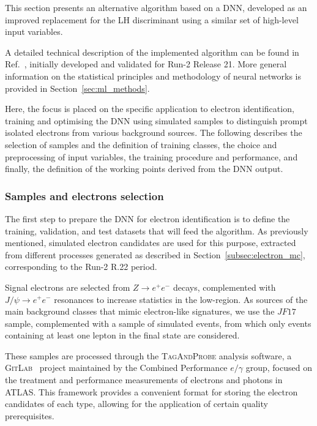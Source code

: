 This section presents an alternative algorithm based on a DNN, developed as an improved replacement for the LH discriminant using a similar set of high-level input variables.

A detailed technical description of the implemented algorithm can be found in Ref.~\cite{dnn_paper}, initially developed and validated for Run-2 Release 21. More general information on the statistical principles and methodology of neural networks is provided in Section~\ref{sec:ml_methods}.

Here, the focus is placed on the specific application to electron identification, training and optimising the DNN using simulated samples to distinguish prompt isolated electrons from various background sources. The following describes the selection of samples and the definition of training classes, the choice and preprocessing of input variables, the training procedure and performance, and finally, the definition of the working points derived from the DNN output.

\subsubsection{Samples and electrons selection}
The first step to prepare the DNN for electron identification is to define the training, validation, and test datasets that will feed the algorithm. As previously mentioned, simulated electron candidates are used for this purpose, extracted from different processes generated as described in Section~\ref{subsec:electron_mc}, corresponding to the Run-2 R.22 period.

Signal electrons are selected from $Z \rightarrow e^{+}e^{-}$ decays, complemented with $J/\psi \rightarrow e^{+}e^{-}$ resonances to increase statistics in the low-\et region. As sources of the main background classes that mimic electron-like signatures, we use the $JF17$ sample, complemented with a sample of simulated \ttbar events, from which only events containing at least one lepton in the final state are considered.

These samples are processed through the \textsc{TagAndProbe} analysis software, a \textsc{GitLab}~\cite{tagandprobe} project maintained by the Combined Performance $e/\gamma$ group, focused on the treatment and performance measurements of electrons and photons in ATLAS. This framework provides a convenient format for storing the electron candidates of each type, allowing for the application of certain quality prerequisites.

